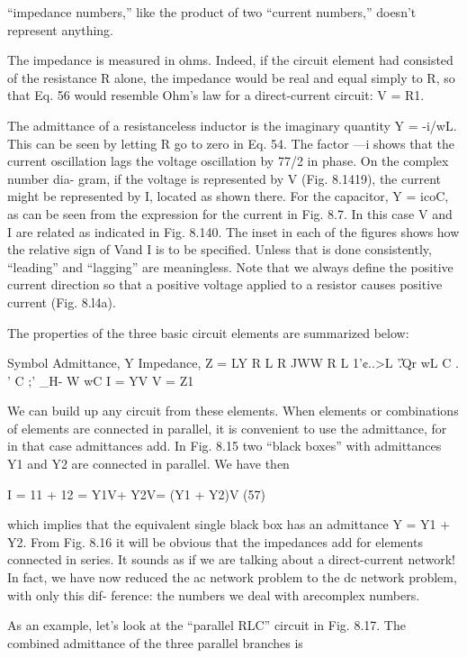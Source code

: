{``impedance numbers,'' like the product of two ``current numbers,'' doesn't represent
anything.

The impedance is measured in ohms. Indeed, if the circuit element
had consisted of the resistance R alone, the impedance would
be real and equal simply to R, so that Eq. 56 would resemble Ohm's
law for a direct-current circuit: V = R1.

The admittance of a resistanceless inductor is the imaginary
quantity Y = -i/wL. This can be seen by letting R go to zero in
Eq. 54. The factor ---i shows that the current oscillation lags the
voltage oscillation by 77/2 in phase. On the complex number dia-
gram, if the voltage is represented by V (Fig. 8.1419), the current
might be represented by I, located as shown there. For the capacitor,
Y = icoC, as can be seen from the expression for the current in
Fig. 8.7. In this case V and I are related as indicated in Fig. 8.140.
The inset in each of the figures shows how the relative sign of Vand I
is to be specified. Unless that is done consistently, ``leading'' and
``lagging'' are meaningless. Note that we always define the positive
current direction so that a positive voltage applied to a resistor causes
positive current (Fig. 8.l4a).

The properties of the three basic circuit elements are summarized
below:

Symbol Admittance, Y Impedance, Z = LY
R L R
JWW R
L  1'¢..>L
'\U.Qr wL
C .
' C ;'
_H- W wC
I = YV V = Z1

We can build up any circuit from these elements. When elements
or combinations of elements are connected in parallel, it is convenient
to use the admittance, for in that case admittances add. In Fig. 8.15
two ``black boxes'' with admittances Y1 and Y2 are connected in
parallel. We have then

I = 11 + 12 = Y1V+ Y2V= (Y1 + Y2)V (57)

  

which implies that the equivalent single black box has an admittance
Y = Y1 + Y2. From Fig. 8.16 it will be obvious that the impedances
add for elements connected in series. It sounds as if we are talking
about a direct-current network! In fact, we have now reduced the
ac network problem to the dc network problem, with only this dif-
ference: the numbers we deal with arecomplex numbers.

As an example, let's look at the ``parallel RLC'' circuit in
Fig. 8.17. The combined admittance of the three parallel branches is

}
